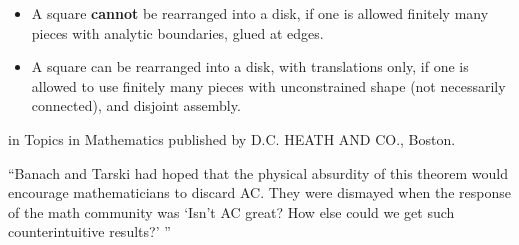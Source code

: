 \begin{itemize}

\item  A square {\bf cannot} be rearranged into a disk, if one is allowed
 finitely many pieces with analytic boundaries, glued at edges.
\item A square can be rearranged into a disk, with translations only,
 if one is allowed to use finitely many pieces with unconstrained
 shape (not necessarily connected), and disjoint assembly. 

\end{itemize}

        \Ref

        {in Topics in Mathematics published by D.C. HEATH AND CO., Boston.}{}


        ``Banach and Tarski had hoped that the physical absurdity of this
        theorem would encourage mathematicians to discard AC. They were
        dismayed when the response of the math community was `Isn't AC great?
        How else could we get such counterintuitive results?' ''


